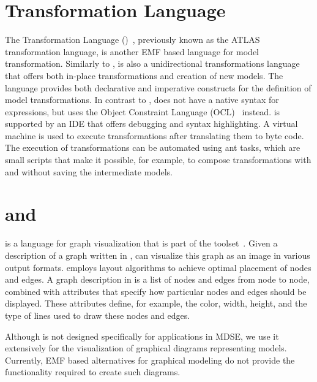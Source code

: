 \section{\ATL Transformation Language}
The \ATL Transformation Language (\ATL)~\cite{ATLqvt}, previously known as the ATLAS transformation language, is another EMF based language for model transformation.
Similarly to \Xtend, \ATL is also a unidirectional transformations language that offers both in-place transformations and creation of new models.
The language provides both declarative and imperative constructs for the definition of model transformations.
In contrast to \Xtend, \ATL does not have a native syntax for expressions, but uses the Object Constraint Language (OCL)~\cite{OCLspec} instead.
\ATL is supported by an IDE that offers debugging and syntax highlighting.
A virtual machine is used to execute transformations after translating them to byte code.
The execution of \ATL transformations can be automated using ant tasks, which are small scripts that make it possible, for example, to compose transformations with and without saving the intermediate models.

\section{\DOT and \graphviz}
\label{sec:tools:dot}
\DOT is a language for graph visualization that is part of the \graphviz toolset~\cite{Ellson01graphviz}.
Given a description of a graph written in \DOT, \graphviz can visualize this graph as an image in various output formats.
\graphviz employs layout algorithms to achieve optimal placement of nodes and edges.
A graph description in \DOT is a list of nodes and edges from node to node, combined with attributes that specify how particular nodes and edges should be displayed.
These attributes define, for example, the color, width, height, and the type of lines used to draw these nodes and edges.

Although \DOT is not designed specifically for applications in MDSE, we use it extensively for the visualization of graphical diagrams representing models.
Currently, EMF based alternatives for graphical modeling do not provide the functionality required to create such diagrams.
